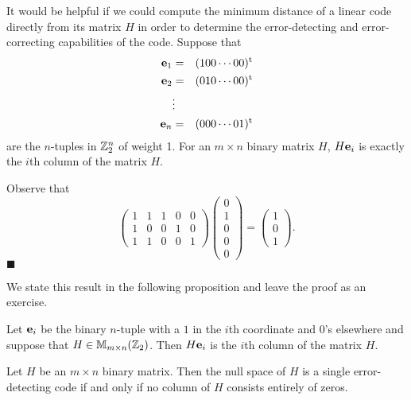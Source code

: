  
\vspace{2ex}
 
 
It would be helpful if we could compute the minimum distance of a
linear code directly from its matrix $H$ in order to determine the
error-detecting and error-correcting capabilities of the code. Suppose
that  
\begin{eqnarray*}
{\bold e}_1 & = & (100 \cdots 00)^{\rm t} \\
{\bold e}_2 & = & (010 \cdots 00)^{\rm t} \\
 & \vdots & \\
{\bold e}_n & = & (000 \cdots 01)^{\rm t}
\end{eqnarray*}
are the $n$-tuples in ${\Bbb Z}_2^n$ of weight 1. For an $m \times
n$ binary matrix $H$, $H{\bold e}_i$ is exactly the $i$th column of
the matrix $H$. 
 
 
\vspace{2ex}
 
 
Observe that
\[
\left(
\begin{array}{ccccc}
1 & 1 & 1 & 0 & 0 \\
1 & 0 & 0 & 1 & 0 \\
1 & 1 & 0 & 0 & 1
\end{array}
\right)
\left(
\begin{array}{c}
 0 \\
1 \\
0 \\
0 \\
0
\end{array}
\right)
=
\left(
\begin{array}{c}
1 \\
0 \\
1
\end{array}
\right).
\]
\hspace{\fill} $\blacksquare$
 
 
\vspace{2ex}
 
 
We state this result in the following proposition and leave the proof
as an exercise. 
 
\begin{proposition}
Let ${\bold e}_i$ be the binary $n$-tuple with a $1$ in the $i$th
coordinate and $0$'s elsewhere and suppose that $H \in {\Bbb M}_{m
\times n}({\Bbb Z}_2)$. Then $H{\bold e}_i$ is the $i$th column of
the matrix $H$.  
\end{proposition}
 
 
\begin{theorem}
Let $H$ be an $m \times n$ binary matrix. Then the null space of $H$
is a single error-detecting code if and only if no column of $H$
consists entirely of zeros. 
\end{theorem}
 
